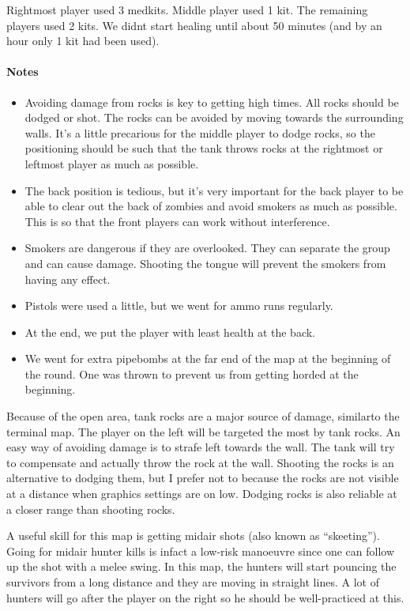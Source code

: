 Rightmost player used 3 medkits. Middle player used 1 kit. The remaining players used 2 kits. We didnt start healing until about 50 minutes (and by an hour only 1 kit had been used).

\paragraph{Notes}
\begin{itemize}
\item Avoiding damage from rocks is key to getting high times. All rocks should be dodged or shot. The rocks can be avoided by moving towards the surrounding walls. It's a little precarious for the middle player to dodge rocks, so the positioning should be such that the tank throws rocks at the rightmost or leftmost player as much as possible.
\item The back position is tedious, but it's very important for the back player to be able to clear out the back of zombies and avoid smokers as much as possible. This is so that the front players can work without interference.
\item Smokers are dangerous if they are overlooked. They can separate the group and can cause damage. Shooting the tongue will prevent the smokers from having any effect.
\item Pistols were used a little, but we went for ammo runs regularly.
\item At the end, we put the player with least health at the back.
\item We went for extra pipebombs at the far end of the map at the beginning of the round. One was thrown to prevent us from getting horded at the beginning.
\end{itemize}

Because of the open area, tank rocks are a major source of damage, similarto the terminal map. The player on the left will be targeted the most by tank rocks. An easy way of avoiding damage is to strafe left towards the wall. The tank will try to compensate and actually throw the rock at the wall. Shooting the rocks is an alternative to dodging them, but I prefer not to because the rocks are not visible at a distance when graphics settings are on low. Dodging rocks is also reliable at a closer range than shooting rocks.

A useful skill for this map is getting midair shots (also known as ``skeeting''). Going for midair hunter kills is infact a low-risk manoeuvre since one can follow up the shot with a melee swing. In this map, the hunters will start pouncing the survivors from a long distance and they are moving in straight lines. A lot of hunters will go after the player on the right so he should be well-practiced at this.

